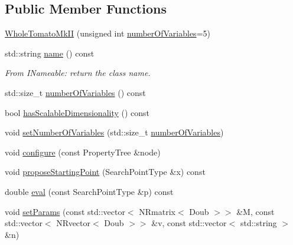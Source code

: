 \subsection*{\-Public \-Member \-Functions}
\begin{DoxyCompactItemize}
\item 
\hyperlink{struct_p_r_p_s_evolution_1_1_whole_tomato_mk_i_i_a5a4949fbc0cc3afa3e688dd6c2360e33}{\-Whole\-Tomato\-Mk\-I\-I} (unsigned int \hyperlink{struct_p_r_p_s_evolution_1_1_whole_tomato_mk_i_i_aa9f1797f16ed60e45270e1636df1553d}{number\-Of\-Variables}=5)
\item 
std\-::string \hyperlink{struct_p_r_p_s_evolution_1_1_whole_tomato_mk_i_i_aabd6a2b42d295addbbf854e42da06253}{name} () const 
\begin{DoxyCompactList}\small\item\em \-From \-I\-Nameable\-: return the class name. \end{DoxyCompactList}\item 
std\-::size\-\_\-t \hyperlink{struct_p_r_p_s_evolution_1_1_whole_tomato_mk_i_i_aa9f1797f16ed60e45270e1636df1553d}{number\-Of\-Variables} () const 
\item 
bool \hyperlink{struct_p_r_p_s_evolution_1_1_whole_tomato_mk_i_i_a1ba67811d378db27f1ae8541d8d4a33d}{has\-Scalable\-Dimensionality} () const 
\item 
void \hyperlink{struct_p_r_p_s_evolution_1_1_whole_tomato_mk_i_i_a2a6b02b7d91b1518ccc7ef3586321f90}{set\-Number\-Of\-Variables} (std\-::size\-\_\-t \hyperlink{struct_p_r_p_s_evolution_1_1_whole_tomato_mk_i_i_aa9f1797f16ed60e45270e1636df1553d}{number\-Of\-Variables})
\item 
void \hyperlink{struct_p_r_p_s_evolution_1_1_whole_tomato_mk_i_i_a518c28c12d6db3ceef9a176abb6f1c08}{configure} (const \-Property\-Tree \&node)
\item 
void \hyperlink{struct_p_r_p_s_evolution_1_1_whole_tomato_mk_i_i_abe3cc7dbc4762af79bd5ff2f31e9463a}{propose\-Starting\-Point} (\-Search\-Point\-Type \&x) const 
\item 
double \hyperlink{struct_p_r_p_s_evolution_1_1_whole_tomato_mk_i_i_ab74138bdc66667033c1e123279bbcbcb}{eval} (const \-Search\-Point\-Type \&p) const 
\item 
void \hyperlink{struct_p_r_p_s_evolution_1_1_whole_tomato_mk_i_i_ac77bc6d01ff180634f38e593ec124813}{set\-Params} (const std\-::vector$<$ \-N\-Rmatrix$<$ \-Doub $>$$>$ \&\-M, const std\-::vector$<$ \-N\-Rvector$<$ \-Doub $>$$>$ \&v, const std\-::vector$<$ std\-::string $>$ \&n)
\item 

\end{DoxyCompactItemize}
